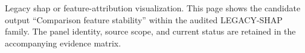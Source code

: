Legacy shap or feature-attribution visualization. This page shows the candidate output ``Comparison feature stability'' within the audited LEGACY-SHAP family. The panel identity, source scope, and current status are retained in the accompanying evidence matrix.
